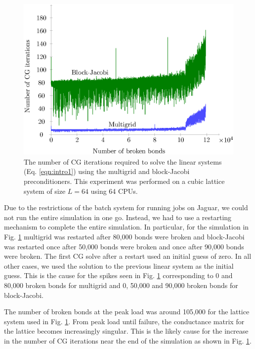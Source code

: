 \documentclass[11pt]{iopart}
\begin{document}
\begin{figure}
\begin{center}
\includegraphics[scale=1.0]{mgBJiters.eps}
\caption{\label{fig:iters} The number of CG iterations required to solve the linear systems
 (Eq. \ref{eqn:intro1}) using the multigrid and block-Jacobi preconditioners. This
 experiment was performed on a cubic lattice system of size $L = 64$ using 64 CPUs.}
\end{center}
\end{figure}

Due to the restrictions of the batch system for running jobs on Jaguar, we could not run the entire simulation in one go. Instead, we had to use a restarting
mechanism to complete the entire simulation. In particular, for the simulation in Fig. \ref{fig:iters} multigrid was restarted after 80,000 bonds were broken and block-Jacobi was
restarted once after 50,000 bonds were broken and once after 90,000 bonds were broken. The first CG solve after a restart used an initial guess of zero.
In all other cases, we used the solution to the previous linear system as the initial guess. This is the cause for the spikes seen in Fig. \ref{fig:iters} 
corresponding to 0 and 80,000 broken bonds for multigrid and 0, 50,000 and 90,000 broken bonds for block-Jacobi.

The number of broken bonds at the peak load was around 105,000 for the lattice system used in Fig. \ref{fig:iters}. From peak load until failure, 
the conductance matrix for the lattice becomes increasingly singular. This is the likely cause for the increase in the number of CG iterations near
the end of the simulation as shown in Fig. \ref{fig:iters}. 
\end{document}
